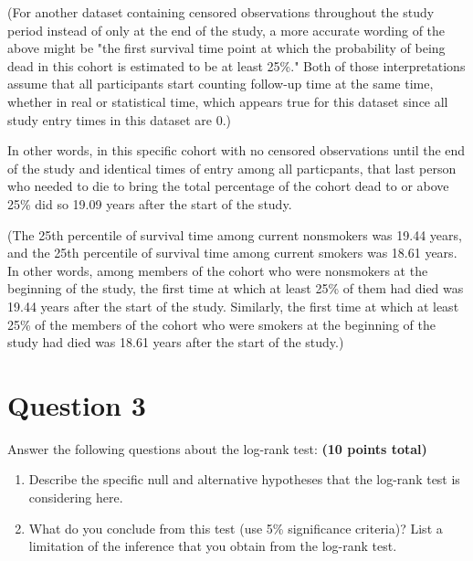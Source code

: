 \documentclass{article}\usepackage[]{graphicx}\usepackage[]{color}
\newif\ifdraft  %
\begin{document}
\vspace{2mm}

(For another dataset containing censored observations throughout the study period instead of only at the end of the study, a more accurate wording of the above might be "the first survival time point at which the probability of being dead in this cohort is estimated to be at least 25\%."  Both of those interpretations assume that all participants start counting follow-up time at the same time, whether in real or statistical time, which appears true for this dataset since all study entry times in this dataset are 0.)

\vspace{2mm}

In other words, in this specific cohort with no censored observations until the end of the study and identical times of entry among all particpants, that last person who needed to die to bring the total percentage of the cohort dead to or above 25\% did so 19.09 years after the start of the study.

\vspace{2mm}

(The 25th percentile of survival time among current nonsmokers was 19.44 years, and the 25th percentile of survival time among current smokers was 18.61 years.  In other words, among members of the cohort who were nonsmokers at the beginning of the study, the first time at which at least 25\% of them had died was 19.44 years after the start of the study.  Similarly, the first time at which at least 25\% of the members of the cohort who were smokers at the beginning of the study had died was 18.61 years after the start of the study.)








\pagebreak

\section*{Question 3}

\ifdraft

Answer the following questions about the log-rank test: \textbf{(10 points total)}
  \begin{enumerate}
    \item Describe the specific null and alternative hypotheses that the log-rank test is considering here.
    \item What do you conclude from this test (use 5\% significance criteria)? List a limitation of the inference that you obtain from the log-rank test.
  \end{enumerate}
\end{document}
